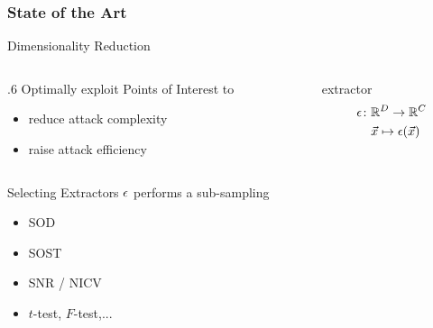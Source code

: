 \begin{frame}
\frametitle{State of the Art}
\begin{block}{Dimensionality Reduction}
\begin{columns}
\begin{column} {.6\textwidth}
Optimally exploit Points of Interest to 
\begin{itemize}
\item reduce attack complexity 
\item raise attack efficiency
\end{itemize}
\end{column}
\begin{column}{.3\textwidth}
\centering extractor  \begin{align*}
\epsilon \colon & \mathbb{R}^D\rightarrow \mathbb{R}^C\\
& \vec{x} \mapsto \epsilon(\vec{x})
\end{align*}

\end{column}
\end{columns}
\end{block}
\begin{columns}

\begin{column}{.4\textwidth}
\begin{block}{Selecting Extractors}
$\epsilon$ performs a sub-sampling
\begin{itemize}
\item SOD \cite{Chari2003}
\item SOST \cite{bar2010improved}
\item SNR \cite{mangard2008power}/ NICV \cite{bhasin2014side}
\item $t$-test, $F$-test,... \cite{gierlichs2006templates,choudary2014efficient}
\end{itemize}
\end{block}
\end{column}

\begin{column}{.6\textwidth}
\end{column}
\end{columns}
\end{frame}
